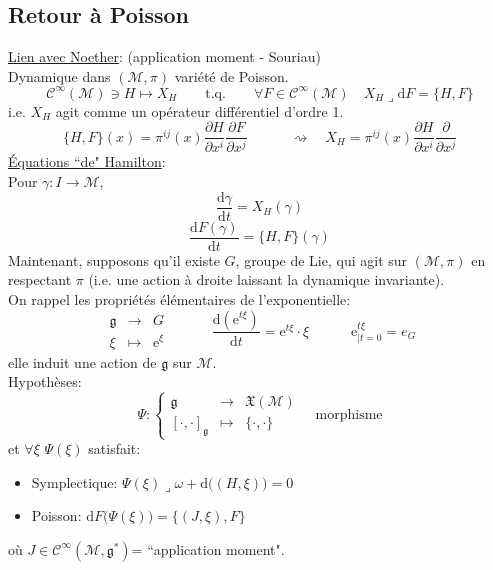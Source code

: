 \documentclass[a4paper,11pt]{article}
\renewcommand{\d}{{\mathrm{d}}}
\newcommand{\e}{{\mathrm{e}}}
\newcommand{\dr}[2]{\frac{\partial {#1}}{\partial{#2}}}
\begin{document}
\subsection{Retour à Poisson}
\noindent \underline{Lien avec Noether}: (application moment - Souriau)\\
Dynamique dans $(\mathcal{M},\pi)$ variété de Poisson.
$$\mathcal{C}^\infty(\mathcal{M}) \ni H \mapsto X_H \quad \quad \mathrm{t}.\mathrm{q}. \quad\quad \forall F \in \mathcal{C}^\infty(\mathcal{M}) \quad X_H \lrcorner \d F = \{H,F\}$$
i.e. $X_H$ agit comme un opérateur différentiel d'ordre 1.
$$\{H,F\}(x) = \pi^{ij}(x) \dr H{x^i} \dr F{x^j} \quad \quad \quad \rightsquigarrow \quad \boxed{X_H = \pi^{ij}(x) \dr H{x^i} \dr{}{x^j}}$$
\underline{Équations ``de" Hamilton}:\\
Pour $\gamma: I\to \mathcal{M}$, 
$$\frac{\d\gamma}{\d t} = X_H(\gamma)$$
$$\frac{\d F(\gamma)}{\d t} = \{H,F\}(\gamma)$$
Maintenant, supposons qu'il existe $G$, groupe de Lie, qui agit sur $(\mathcal{M},\pi)$ en respectant $\pi$ (i.e. une action à droite laissant la dynamique invariante).\\
On rappel les propriétés élémentaires de l'exponentielle:
$$\begin{matrix}
\mathfrak{g} & \to & G\\
\xi & \mapsto & \e^\xi
\end{matrix}
\quad \quad \quad
\frac{\d \left(\e^{t\xi}\right)}{\d t} = \e^{t\xi}\cdot\xi
 \quad \quad \quad
\e^{t\xi}_{|t=0} = e_G$$
elle induit une action de $\mathfrak{g}$ sur $\mathcal{M}$.\\
Hypothèses:
$$\Psi: \left\{
\begin{matrix}
\mathfrak{g} & \to & \mathfrak{X}(\mathcal{M})\\
[\cdot,\cdot]_\mathfrak{g} & \mapsto & \{\cdot,\cdot\}
\end{matrix}\right.\quad \mathrm{morphisme}$$
et $\forall \xi$ $\Psi(\xi)$ satisfait:
\begin{itemize}
\item Symplectique: $\Psi(\xi) \lrcorner \omega + \d \big((H,\xi)\big) = 0$
\item Poisson: $\d F\big(\Psi(\xi)\big) = \{(J,\xi),F\}$
\end{itemize}
où $J\in\mathcal{C}^\infty(\mathcal{M},\mathfrak{g}^*)$= ``application moment".
\end{document}
